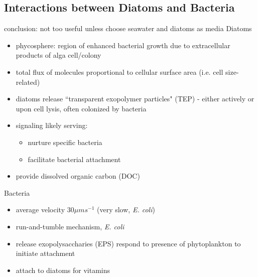 \documentclass[a4paper,11pt]{article}
\begin{document}
    \subsection{Interactions between Diatoms and Bacteria}
    conclusion\autocite{amin2012interactions}: not too useful unless choose seawater and diatoms as media
    Diatoms
    \begin{itemize}
        \item phycosphere: region of enhanced bacterial growth due to extracellular products of alga cell/colony
        \item total flux of molecules proportional to cellular surface area (i.e. cell size-related)
        \item diatoms release ``transparent exopolymer particles" (TEP) - either actively or upon cell lysis, often colonized by bacteria
        \item signaling likely serving:
        \begin{itemize}
            \item nurture specific bacteria
            \item facilitate bacterial attachment
        \end{itemize}
        \item provide dissolved organic carbon (DOC)
    \end{itemize}
    Bacteria
    \begin{itemize}
        \item average velocity 30$\mu ms^{-1}$ (very slow, \textit{E. coli})
        \item run-and-tumble mechanism, \textit{E. coli}
        \item release exopolysaccharies (EPS) respond to presence of phytoplankton to initiate attachment
        \item attach to diatoms for vitamins
    \end{itemize}
    
\end{document}
